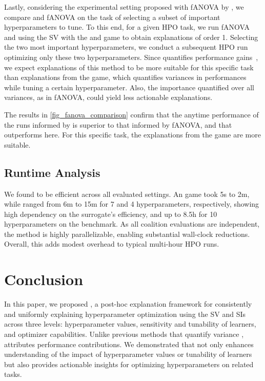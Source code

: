 \documentclass[letterpaper]{article} %
\begin{document}
Lastly, considering the experimental setting proposed with fANOVA by \citet{fANOVA}, we compare \tool and fANOVA on the task of selecting a subset of important hyperparameters to tune.
To this end, for a given HPO task, we run fANOVA and \tool using the \gls*{SV} with the \dstunability and \sensitivity game to obtain explanations of order 1. 
Selecting the two most important hyperparameters, we conduct a subsequent HPO run optimizing only these two hyperparameters.
Since \dstunability quantifies performance gains~\cite{tunability}, we expect explanations of this method to be more suitable for this specific task than explanations from the \sensitivity game, which quantifies variances in performances while tuning a certain hyperparameter. Also, the importance quantified over all variances, as in fANOVA, could yield less actionable explanations.

The results in \cref{fig_fanova_comparison} confirm that the anytime performance of the runs informed by \tool is superior to that informed by fANOVA, and that \dstunability outperforms \sensitivity here.
For this specific task, the explanations from the \dstunability game are more suitable.

\subsection{Runtime Analysis}
We found \tool to be efficient across all evaluated settings. An \ablation game took 5s to 2m, while \dstunability ranged from 6m to 15m for 7 and 4 hyperparameters, respectively, showing high dependency on the surrogate's efficiency, and up to 8.5h for 10 hyperparameters on the \jahs benchmark. As all coalition evaluations are independent, the method is highly parallelizable, enabling substantial wall-clock reductions. Overall, this adds modest overhead to typical multi-hour HPO runs.

\section{Conclusion}
In this paper, we proposed \tool, a post-hoc explanation framework for consistently and uniformly explaining hyperparameter optimization using the \gls*{SV} and \glspl*{SI} across three levels: hyperparameter values, sensitivity and tunability of learners, and optimizer capabilities. Unlike previous methods that quantify variance \cite{fANOVA}, \tool attributes performance contributions. We demonstrated that \tool not only enhances understanding of the impact of hyperparameter values or tunability of learners but also provides actionable insights for optimizing hyperparameters on related tasks.
\end{document}
